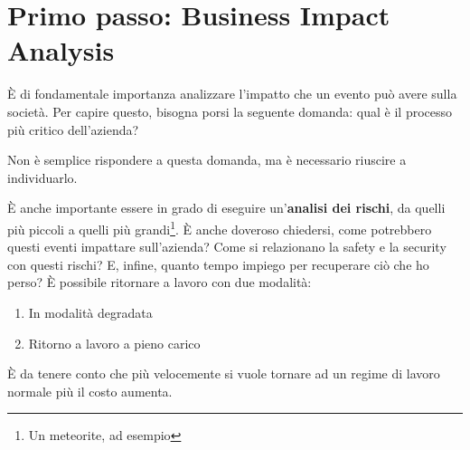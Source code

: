\section{Primo passo: Business Impact Analysis}

È di fondamentale importanza analizzare l'impatto che un evento può avere sulla 
società. Per capire questo, bisogna porsi la seguente domanda: qual è il 
processo più critico dell'azienda?

Non è semplice rispondere a questa domanda, ma è necessario riuscire a 
individuarlo.

È anche importante essere in grado di eseguire un'\textbf{analisi dei rischi}, 
da quelli più piccoli a quelli più grandi\footnote{Un meteorite, ad esempio}. È 
anche doveroso chiedersi, come potrebbero questi eventi impattare sull'azienda? 
Come si relazionano la safety e la security con questi rischi? E, infine, 
quanto tempo impiego per recuperare ciò che ho perso? È possibile ritornare a 
lavoro con due modalità:
\begin{enumerate}
  \item In modalità degradata
  \item Ritorno a lavoro a pieno carico
\end{enumerate}

È da tenere conto che più velocemente si vuole tornare ad un regime di lavoro 
normale più il costo aumenta.